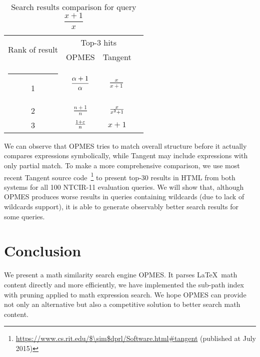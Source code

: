 \documentclass{llncs}
\makeatletter
\newcommand{\thickhline}{%
    \noalign {\ifnum 0=`}\fi \hrule height 1pt
    \futurelet \reserved@a \@xhline
}
\renewcommand{\arraystretch}{1.6}
\makeatother
\begin{document}
\begin{table}
\begin{minipage}[b]{4.5in}
\caption{Search results comparison for query $\dfrac{x+1}x$} 
\label{comp1}
\begin{center}
\renewcommand{\arraystretch}{2.0}
\begin{tabular}{cccc}
\multirow{2}{*}{Rank of result} & \multicolumn{2}{c}{Top-3 hits} \\
\cline{2-3}
& OPMES & Tangent \\
\thickhline
1 & ${\displaystyle{\alpha+1\over\alpha}}$               & $\frac{x}{x+1}\,$        \\ \hline
2 & ${\displaystyle{\tfrac{n+1}{n}}} $                   & ${x\over x^{2}+1}$       \\ \hline
3 & ${\displaystyle\textstyle{\frac{1+\varepsilon}{n}}}$ & $x + 1$                  \\ \hline
\end{tabular}
\renewcommand{\arraystretch}{1}
\end{center}
\end{minipage}
\end{table}
We can observe that OPMES tries to match overall structure before it actually compares expressions symbolically, while Tangent may include expressions with only partial match.
To make a more comprehensive comparison, we use most recent Tangent source code~\footnote{\url{https://www.cs.rit.edu/$\sim$dprl/Software.html\#tangent} (published at July 2015)} 
to present top-30 results in HTML from both systems for all 100 NTCIR-11 evaluation queries. 
We will show that, although OPMES produces worse results in queries containing wildcards (due to lack of wildcards support), 
it is able to generate observably better search results for some queries.

\section{Conclusion}
We present a math similarity search engine OPMES. It parses \LaTeX\ math content directly and more efficiently, 
we have implemented the sub-path index with pruning applied to math expression search. 
We hope OPMES can provide not only an alternative but also a competitive solution to better search math content. 



\end{document}
